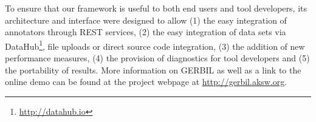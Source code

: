 To ensure that our framework is useful to both end users and tool developers, its architecture and interface were designed to allow (1) the easy integration of annotators through REST services, (2) the easy integration of data sets via DataHub\footnote{\url{http://datahub.io}}, file uploads or direct source code integration, (3) the addition of new performance measures, (4) the provision of diagnostics for tool developers and (5) the portability of results. 
More information on GERBIL as well as a link to the online demo can be found at the project webpage at \url{http://gerbil.aksw.org}.

